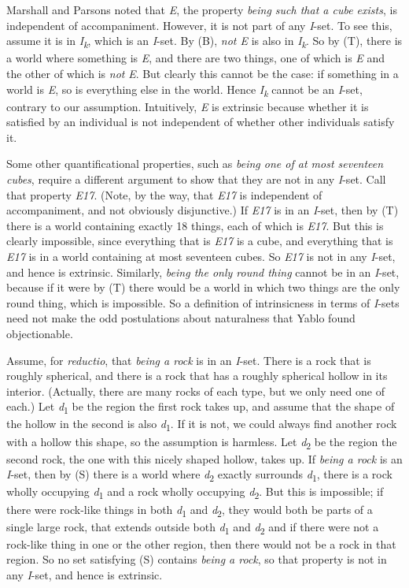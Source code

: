 \documentclass[
  11pt,
  letterpaper,
  DIV=11,
  numbers=noendperiod,
  twoside]{scrartcl}
\begin{document}
Marshall and Parsons noted that \emph{E}, the property \emph{being such
that a cube exists}, is independent of accompaniment. However, it is not
part of any \emph{I}-set. To see this, assume it is in
\emph{I\textsubscript{k}}, which is an \emph{I}-set. By (B), \emph{not
E} is also in \emph{I\textsubscript{k}}. So by (T), there is a world
where something is \emph{E}, and there are two things, one of which is
\emph{E} and the other of which is \emph{not} \emph{E}. But clearly this
cannot be the case: if something in a world is \emph{E}, so is
everything else in the world. Hence \emph{I\textsubscript{k}} cannot be
an \emph{I}-set, contrary to our assumption. Intuitively, \emph{E} is
extrinsic because whether it is satisfied by an individual is not
independent of whether other individuals satisfy it.

Some other quantificational properties, such as \emph{being one of at
most seventeen cubes}, require a different argument to show that they
are not in any \emph{I}-set. Call that property \emph{E17}. (Note, by
the way, that \emph{E17} is independent of accompaniment, and not
obviously disjunctive.) If \emph{E17} is in an \emph{I}-set, then by (T)
there is a world containing exactly 18 things, each of which is
\emph{E17}. But this is clearly impossible, since everything that is
\emph{E17} is a cube, and everything that is \emph{E17} is in a world
containing at most seventeen cubes. So \emph{E17} is not in any
\emph{I}-set, and hence is extrinsic. Similarly, \emph{being the only
round thing} cannot be in an \emph{I}-set, because if it were by (T)
there would be a world in which two things are the only round thing,
which is impossible. So a definition of intrinsicness in terms of
\emph{I}-sets need not make the odd postulations about naturalness that
Yablo found objectionable.

Assume, for \emph{reductio}, that \emph{being a rock} is in an
\emph{I}-set. There is a rock that is roughly spherical, and there is a
rock that has a roughly spherical hollow in its interior. (Actually,
there are many rocks of each type, but we only need one of each.) Let
\emph{d}\textsubscript{1} be the region the first rock takes up, and
assume that the shape of the hollow in the second is also
\emph{d}\textsubscript{1}. If it is not, we could always find another
rock with a hollow this shape, so the assumption is harmless. Let
\emph{d}\textsubscript{2} be the region the second rock, the one with
this nicely shaped hollow, takes up. If \emph{being a rock} is an
\emph{I}-set, then by (S) there is a world where
\emph{d}\textsubscript{2} exactly surrounds \emph{d}\textsubscript{1},
there is a rock wholly occupying \emph{d}\textsubscript{1} and a rock
wholly occupying \emph{d}\textsubscript{2}. But this is impossible; if
there were rock-like things in both \emph{d}\textsubscript{1} and
\emph{d}\textsubscript{2}, they would both be parts of a single large
rock, that extends outside both \emph{d}\textsubscript{1} and
\emph{d}\textsubscript{2} and if there were not a rock-like thing in one
or the other region, then there would not be a rock in that region. So
no set satisfying (S) contains \emph{being a rock}, so that property is
not in any \emph{I}-set, and hence is extrinsic.
\end{document}
